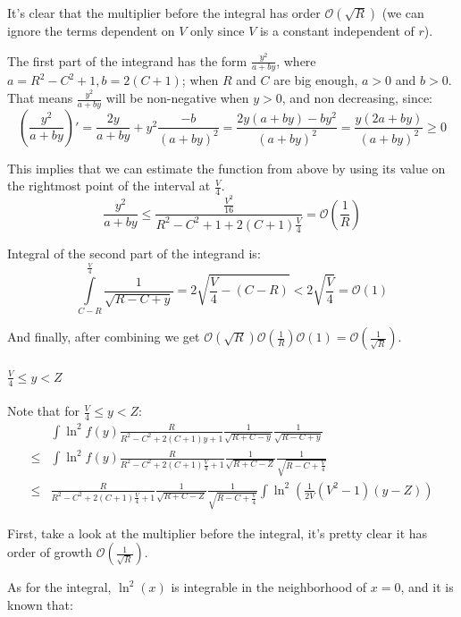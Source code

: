 \documentclass{gCOV2e}
\theoremstyle{plain}%
\theoremstyle{definition}
\theoremstyle{remark}
\begin{document}
It's clear that the multiplier before the integral has order $\mathcal{O}(\sqrt{R})$ (we can ignore the terms dependent on $V$ only since $V$ is a constant independent of $r$).

The first part of the integrand has the form $\frac{y^2}{a + b y}$, where $a = R^2 - C^2 + 1, b = 2 (C + 1)$; when $R$ and $C$ are big enough, $a > 0$ and $b > 0$. That means $\frac{y^2}{a + b y}$ will be non-negative when $y > 0$, and non decreasing, since:
\[
  \left(\frac{y^2}{a + b y}\right)'
= \frac{2y}{a + by} + y^2 \frac{-b}{(a + by)^2}
= \frac{2y (a + by) - b y^2}{(a + by)^2}
= \frac{y (2a + by)}{(a + by)^2}
\ge 0
\]

This implies that we can estimate the function from above by using its value on the rightmost point of the interval at $\frac{V}{4}$.
\[
\frac{y^2}{a + b y} \le \frac{\frac{V^2}{16}}{R^2 - C^2 + 1 + 2 (C + 1) \frac{V}{4}} = \mathcal{O}\left(\frac{1}{R}\right)
\]

Integral of the second part of the integrand is:
\[
\int\limits_{C - R}^{\frac{V}{4}} \frac{1}{\sqrt{R - C + y}} = 2 \sqrt{\frac{V}{4} - (C - R)} < 2 \sqrt{\frac{V}{4}} = \mathcal{O}(1)
\]

And finally, after combining we get $\mathcal{O}(\sqrt{R}) \mathcal{O}\left(\frac{1}{R}\right) \mathcal{O}(1)  = \mathcal{O}\left(\frac{1}{\sqrt{R}}\right)$.

\paragraph{$\frac{V}{4} \le y < Z$}

Note that for $\frac{V}{4} \le y < Z$:
\begin{align*}
       & \int \ln^2 f(y) \frac{R}{R^2 - C^2 + 2 (C + 1) y + 1} \frac{1}{\sqrt{R + C - y}} \frac{1}{\sqrt{R - C + y}} 
\\ \le & \int \ln^2 f(y) \frac{R}{R^2 - C^2 + 2 (C + 1) \frac{V}{4} + 1} \frac{1}{\sqrt{R + C - Z}} \frac{1}{\sqrt{R - C + \frac{V}{4}}}
\\ \le &  \frac{R}{R^2 - C^2 + 2 (C + 1) \frac{V}{4} + 1} \frac{1}{\sqrt{R + C - Z}} \frac{1}{\sqrt{R - C + \frac{V}{4}}} \int \ln^2 \left( \frac{1}{2 V}(V^2 - 1) (y - Z) \right)
\end{align*}

First, take a look at the multiplier before the integral, it's pretty clear it has order of growth $\mathcal{O}(\frac{1}{\sqrt{R}})$.

As for the integral, $\ln^2(x)$ is integrable in the neighborhood of $x = 0$, and it is known that: %
\end{document}
